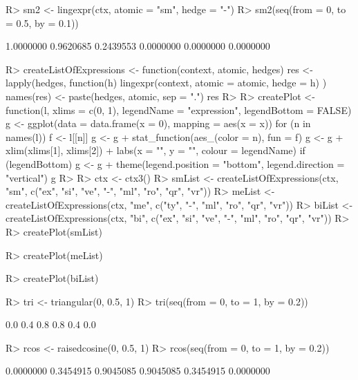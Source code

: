 \documentclass{article}\usepackage[]{graphicx}\usepackage[]{color}
\begin{document}
\begin{Schunk}
% --begin: "emptyhedge2"
\begin{Sinput}
R> sm2 <- lingexpr(ctx, atomic = "sm", hedge = "-")
R> sm2(seq(from = 0, to = 0.5, by = 0.1))
\end{Sinput}
\begin{Soutput}
[1] 1.0000000 0.9620685 0.2439553 0.0000000 0.0000000 0.0000000
\end{Soutput}
%
% --end: "emptyhedge2"
\end{Schunk}

\begin{Schunk}
\begin{Sinput}
R> createListOfExpressions <- function(context, atomic, hedges) {
       res <- lapply(hedges, function(h) {
           lingexpr(context, atomic = atomic, hedge = h)
       })
       names(res) <- paste(hedges, atomic, sep = ".")
       res
   }
R> 
R> createPlot <- function(l, xlims = c(0, 1), legendName = "expression", legendBottom = FALSE) {
       g <- ggplot(data = data.frame(x = 0), mapping = aes(x = x))
       for (n in names(l)) {
           f <- l[[n]]
           g <- g + stat_function(aes_(color = n), fun = f)
       }
       g <- g + xlim(xlims[1], xlims[2]) + labs(x = "", y = "", colour = legendName)
       if (legendBottom) {
           g <- g + theme(legend.position = "bottom", legend.direction = "vertical")
       }
       g
   }
R> 
R> ctx <- ctx3()
R> smList <- createListOfExpressions(ctx, "sm", c("ex", "si", "ve", "-", "ml", 
       "ro", "qr", "vr"))
R> meList <- createListOfExpressions(ctx, "me", c("ty", "-", "ml", "ro", "qr", 
       "vr"))
R> biList <- createListOfExpressions(ctx, "bi", c("ex", "si", "ve", "-", "ml", 
       "ro", "qr", "vr"))
R> 
R> createPlot(smList)
\end{Sinput}
\end{Schunk}

\begin{Schunk}
\begin{Sinput}
R> createPlot(meList)
\end{Sinput}
\end{Schunk}

\begin{Schunk}
\begin{Sinput}
R> createPlot(biList)
\end{Sinput}
\end{Schunk}

\begin{Schunk}
% --begin: "triangular"
\begin{Sinput}
R> tri <- triangular(0, 0.5, 1)
R> tri(seq(from = 0, to = 1, by = 0.2))
\end{Sinput}
\begin{Soutput}
[1] 0.0 0.4 0.8 0.8 0.4 0.0
\end{Soutput}
\begin{Sinput}
R> rcos <- raisedcosine(0, 0.5, 1)
R> rcos(seq(from = 0, to = 1, by = 0.2))
\end{Sinput}
\begin{Soutput}
[1] 0.0000000 0.3454915 0.9045085 0.9045085 0.3454915 0.0000000
\end{Soutput}
%
% --end: "triangular"
\end{Schunk}
\end{document}
